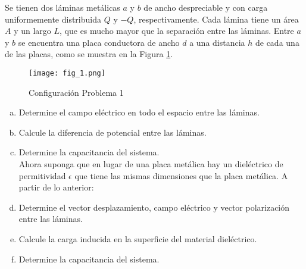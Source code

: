 \noindent Se tienen dos láminas metálicas $a$ y $b$ de ancho despreciable y con carga uniformemente distribuida $Q$ y $-Q$, respectivamente. Cada lámina tiene un área $A$ y un largo $L$, que es mucho mayor que la separación entre las láminas. Entre $a$ y $b$ se encuentra una placa conductora de ancho $d$ a una distancia $h$ de cada una de las placas, como se muestra en la Figura \ref{fig:fig_1}.

\begin{figure}[H]
    \centering
    \texttt{[image: fig\_1.png]}
    \caption{Configuración Problema 1}
    \label{fig:fig_1}
\end{figure}

\begin{enumerate}[a)]
    \item Determine el campo eléctrico en todo el espacio entre las láminas.
    \item Calcule la diferencia de potencial entre las láminas.
    \item Determine la capacitancia del sistema. \\
    
    Ahora suponga que en lugar de una placa metálica hay un dieléctrico de permitividad $\epsilon$ que tiene las mismas dimensiones que la placa metálica. A partir de lo anterior:
    
    \item Determine el vector desplazamiento, campo eléctrico y vector polarización entre las láminas.
    \item Calcule la carga inducida en la superficie del material dieléctrico.
    \item Determine la capacitancia del sistema.
\end{enumerate}